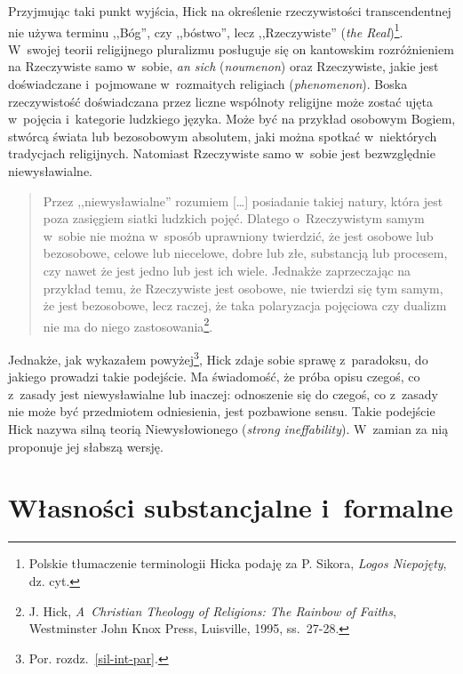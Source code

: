 Przyjmując taki punkt wyjścia, Hick na określenie rzeczywistości transcendentnej nie używa terminu ,,Bóg'', czy ,,bóstwo'', lecz ,,Rzeczywiste'' (\textit{the Real})\footnote{Polskie tłumaczenie terminologii Hicka podaję za P. Sikora, \textit{Logos Niepojęty}, dz. cyt.}. W~swojej teorii religijnego pluralizmu posługuje się on kantowskim rozróżnieniem na Rzeczywiste samo w~sobie, \textit{an sich} (\textit{noumenon}) oraz Rzeczywiste, jakie jest doświadczane i~pojmowane w~rozmaitych religiach (\textit{phenomenon}). Boska rzeczywistość doświadczana przez liczne wspólnoty religijne może zostać ujęta w~pojęcia i~kategorie ludzkiego języka. Może być na przykład osobowym Bogiem, stwórcą świata lub bezosobowym absolutem, jaki można spotkać w~niektórych tradycjach religijnych. Natomiast Rzeczywiste samo w~sobie jest bezwzględnie niewysławialne.

\begin{quote}
Przez ,,niewysławialne'' rozumiem [\ldots] posiadanie takiej natury, która jest poza zasięgiem siatki ludzkich pojęć. Dlatego o~Rzeczywistym samym w~sobie nie można w~sposób uprawniony twierdzić, że jest osobowe lub bezosobowe, celowe lub niecelowe, dobre lub złe, substancją lub procesem, czy nawet że jest jedno lub jest ich wiele. Jednakże zaprzeczając na przykład temu, że Rzeczywiste jest osobowe, nie twierdzi się tym samym, że jest bezosobowe, lecz raczej, że taka polaryzacja pojęciowa czy dualizm nie ma do niego zastosowania\footnote{J. Hick, \textit{A~Christian Theology of Religions: The Rainbow of Faiths}, Westminster John Knox Press, Luisville, 1995, ss.~27-28.}.
\end{quote}

Jednakże, jak wykazałem powyżej\footnote{Por. rozdz.~\ref{sil-int-par}.}, Hick zdaje sobie sprawę z~paradoksu, do jakiego prowadzi takie podejście. Ma świadomość, że próba opisu czegoś, co z~zasady jest niewysławialne lub inaczej: odnoszenie się do czegoś, co z~zasady nie może być przedmiotem odniesienia, jest pozbawione sensu. Takie podejście Hick nazywa silną teorią Niewysłowionego (\textit{strong ineffability}). W~zamian za nią proponuje jej słabszą wersję.


\section{Własności substancjalne i~formalne}

